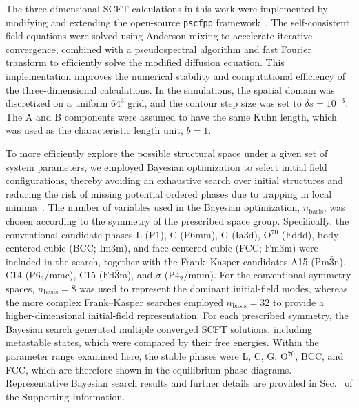 The three-dimensional SCFT calculations in this work were implemented by modifying and extending the open-source \texttt{pscfpp} framework~\cite{Cheong2020Opensource}.
The self-consistent field equations were solved using Anderson mixing to accelerate iterative convergence, combined with a pseudospectral algorithm and fast Fourier transform to efficiently solve the modified diffusion equation.
This implementation improves the numerical stability and computational efficiency of the three-dimensional calculations.
In the simulations, the spatial domain was discretized on a uniform $64^3$ grid, and the contour step size was set to $\delta s = 10^{-3}$.
The A and B components were assumed to have the same Kuhn length, which was used as the characteristic length unit, $b=1$.


To more efficiently explore the possible structural space under a given set of system parameters, we employed Bayesian optimization to select initial field configurations, thereby avoiding an exhaustive search over initial structures and reducing the risk of missing potential ordered phases due to trapping in local minima~\cite{Dong2024Automated}.
The number of variables used in the Bayesian optimization, $n_{\text{basis}}$, was chosen according to the symmetry of the prescribed space group.
 Specifically, the conventional candidate phases L ($\text{P1}$), C ($\text{P6mm}$), G ($\text{Ia}\bar{3}\text{d}$), O$^{70}$ ($\text{Fddd}$), body-centered cubic (BCC; $\text{Im}\bar{3}\text{m}$), and face-centered cubic (FCC; $\text{Fm}\bar{3}\text{m}$) were included in the search, together with the Frank--Kasper candidates A15 ($\text{Pm}\bar{3}\text{n}$), C14 ($\text{P6}_3/\text{mmc}$), C15 ($\text{Fd}\bar{3}\text{m}$), and $\sigma$ ($\text{P4}_2/\text{mnm}$).
For the conventional symmetry spaces, $n_{\mathrm{basis}}=8$ was used to represent the dominant initial-field modes, whereas the more complex Frank--Kasper searches employed $n_{\mathrm{basis}}=32$ to provide a higher-dimensional initial-field representation.
For each prescribed symmetry, the Bayesian search generated multiple converged SCFT solutions, including metastable states, which were compared by their free energies.
Within the parameter range examined here, the stable phases were L, C, G, O$^{70}$, BCC, and FCC, which are therefore shown in the equilibrium phase diagrams.
Representative Bayesian search results and further details are provided in Sec.~ of the Supporting Information.



